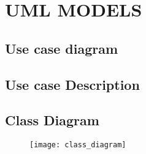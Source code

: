 
\section{UML MODELS}
\subsection{Use case diagram}
\subsection{Use case Description}
\subsection{Class Diagram}
\begin{figure}[h]
	\centering
	\texttt{[image: class\_diagram]}
\end{figure}